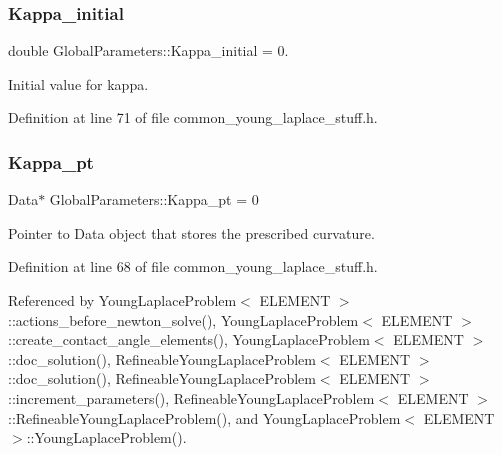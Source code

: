 \mbox{\label{namespaceGlobalParameters_ae7651e73d3f8346da9fcfdbb149bc22e}} 
\subsubsection{\texorpdfstring{Kappa\+\_\+initial}{Kappa\_initial}}
{\footnotesize\ttfamily double Global\+Parameters\+::\+Kappa\+\_\+initial = 0.}



Initial value for kappa. 



Definition at line 71 of file common\+\_\+young\+\_\+laplace\+\_\+stuff.\+h.

\mbox{\label{namespaceGlobalParameters_ac6234184cce40ab2c6bec92b37e4ae41}} 
\subsubsection{\texorpdfstring{Kappa\+\_\+pt}{Kappa\_pt}}
{\footnotesize\ttfamily Data$\ast$ Global\+Parameters\+::\+Kappa\+\_\+pt = 0}



Pointer to Data object that stores the prescribed curvature. 



Definition at line 68 of file common\+\_\+young\+\_\+laplace\+\_\+stuff.\+h.



Referenced by Young\+Laplace\+Problem$<$ E\+L\+E\+M\+E\+N\+T $>$\+::actions\+\_\+before\+\_\+newton\+\_\+solve(), Young\+Laplace\+Problem$<$ E\+L\+E\+M\+E\+N\+T $>$\+::create\+\_\+contact\+\_\+angle\+\_\+elements(), Young\+Laplace\+Problem$<$ E\+L\+E\+M\+E\+N\+T $>$\+::doc\+\_\+solution(), Refineable\+Young\+Laplace\+Problem$<$ E\+L\+E\+M\+E\+N\+T $>$\+::doc\+\_\+solution(), Refineable\+Young\+Laplace\+Problem$<$ E\+L\+E\+M\+E\+N\+T $>$\+::increment\+\_\+parameters(), Refineable\+Young\+Laplace\+Problem$<$ E\+L\+E\+M\+E\+N\+T $>$\+::\+Refineable\+Young\+Laplace\+Problem(), and Young\+Laplace\+Problem$<$ E\+L\+E\+M\+E\+N\+T $>$\+::\+Young\+Laplace\+Problem().

